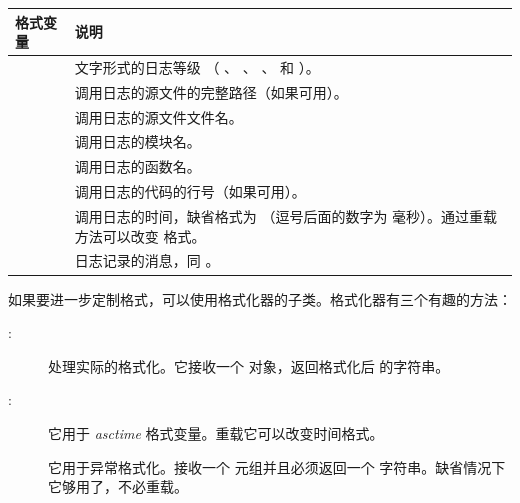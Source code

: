 \documentclass[a4paper,12pt]{sphinxmanual}
\begin{document}
\begin{tabulary}{\linewidth}{|p{3cm}|p{12cm}|}
\hline
\textbf{
格式变量
} & \textbf{
说明
}\\\hline

 & 
文字形式的日志等级
（  、  、  、
 和  ）。
\\\hline

 & 
调用日志的源文件的完整路径（如果可用）。
\\\hline

 & 
调用日志的源文件文件名。
\\\hline

 & 
调用日志的模块名。
\\\hline

 & 
调用日志的函数名。
\\\hline

 & 
调用日志的代码的行号（如果可用）。
\\\hline

 & 
调用日志的时间，缺省格式为
 （逗号后面的数字为
毫秒）。通过重载
\href{http://docs.python.org/dev/library/logging.html\#logging.Formatter.formatTime}{} 方法可以改变
格式。
\\\hline

 & 
日志记录的消息，同  。
\\\hline
\end{tabulary}


如果要进一步定制格式，可以使用格式化器的子类。格式化器有三个有趣的方法：
\begin{description}
\item[{\href{http://docs.python.org/dev/library/logging.html\#logging.Formatter.format}{}:}] \leavevmode
处理实际的格式化。它接收一个 \href{http://docs.python.org/dev/library/logging.html\#logging.LogRecord}{} 对象，返回格式化后
的字符串。

\item[{\href{http://docs.python.org/dev/library/logging.html\#logging.Formatter.formatTime}{}:}] \leavevmode
它用于 \emph{asctime} 格式变量。重载它可以改变时间格式。

\item[{\href{http://docs.python.org/dev/library/logging.html\#logging.Formatter.formatException}{}}] \leavevmode
它用于异常格式化。接收一个  元组并且必须返回一个
字符串。缺省情况下它够用了，不必重载。

\end{description}
\end{document}
